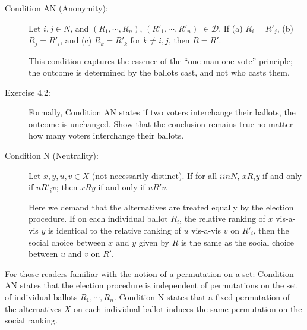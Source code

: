 \documentclass{article}
\begin{document}
\begin{description}

\item[Condition AN (Anonymity):] Let $i,j \in N$, and $(R_{1},\cdots,R_{n})$, $(R'_{1},\cdots,R'_{n})$ $\in \mathcal{D}$. If (a) $R_{i} = R'_{j}$, (b) $R_{j} = R'_{i}$, and (c) $R_{k} = R'_{k}$ for $k \neq i,j$, then $R = R'$.

  This condition captures the essence of the ``one man-one vote'' principle; the outcome is determined by the ballots cast, and not who casts them.

\item[Exercise 4.2:] Formally, Condition AN states if two voters interchange their ballots, the outcome is unchanged. Show that the conclusion remains true no matter how many voters interchange their ballots.

\item[Condition N (Neutrality):] Let $x,y,u,v \in X$ (not necessarily distinct). If for all $i in N$, $xR_{i}y$ if and only if $uR'_{i}v$; then $xRy$ if and only if $uR'v$.

  Here we demand that the alternatives are treated equally by the election procedure. If on each individual ballot $R_{i}$, the relative ranking of $x$ vis-a-vis $y$ is identical to the relative ranking of $u$ vis-a-vis $v$ on $R'_{i}$, then the social choice between $x$ and $y$ given by $R$ is the same as the social choice between $u$ and $v$ on $R'$.

\end{description}

For those readers familiar with the notion of a permutation on a set: Condition AN states that the election procedure is independent of permutations on the set of individual ballots $R_{1},\cdots,R_{n}$. Condition N states that a fixed permutation of the alternatives $X$ on each individual ballot induces the same permutation on the social ranking.
\end{document}
